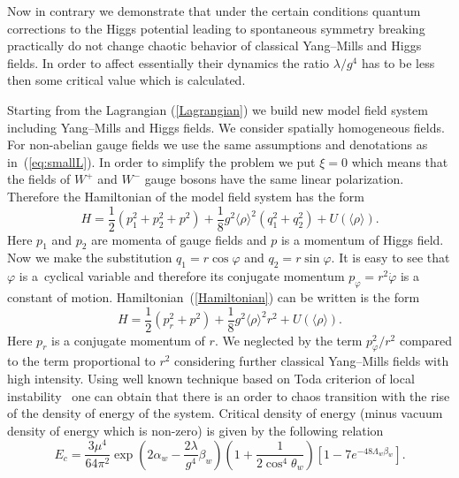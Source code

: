 \documentclass[a4paper,12pt]{article}
\begin{document}
Now in contrary we demonstrate that under the certain conditions quantum corrections
to the Higgs potential leading to spontaneous symmetry breaking practically do not
change chaotic behavior of classical Yang--Mills and Higgs fields. In order to affect
essentially their dynamics the ratio $\lambda / g^{4}$ has to be less then some
critical value which is calculated.

Starting from the Lagrangian (\ref{Lagrangian}) we build new model field system
including Yang--Mills and Higgs fields. We consider spatially homogeneous fields. For
non-abelian gauge fields we use the same assumptions and denotations as
 in~(\ref{eq:smallL}). In order to simplify the problem we put $\xi =0$ which means that
the fields of $W^+$ and $W^-$ gauge bosons have the same linear polarization.
Therefore the Hamiltonian of the model field system has the form
\begin{equation}\label{Hamiltonian}
H = \frac{1}{2}\left(p_1^2 + p_2^2 + p^2\right) + \frac{1}{8} g^{2} \langle
\rho\rangle^{2} \left(q_1^2 + q_2^2\right) + U(\langle \rho\rangle).
\end{equation}
Here $p_1$ and $p_2$ are momenta of gauge fields and $p$ is a momentum of Higgs field.
Now we make the substitution $q_1 = r \cos{\varphi}$ and $q_2 = r \sin{\varphi}$. It
is easy to see that $\varphi$ is a~cyclical variable and therefore its conjugate
momentum $p_\varphi = r^2 \dot{\varphi}$ is a constant of motion.
Hamiltonian~(\ref{Hamiltonian}) can be written is the form
\begin{equation}\label{H}
  H = \frac{1}{2} \left(p_r^2 + p^2\right) + \frac{1}{8} g^{2} \langle \rho\rangle^2 r^2 +
U(\langle\rho\rangle).
\end{equation}
Here $p_r$ is a conjugate momentum of $r$. We neglected by the term $p_\varphi^2 /
r^2$ compared to the term proportional to $r^2$ considering further classical
Yang--Mills fields with high intensity. Using well known technique based on Toda
criterion of local instability~\cite{Salasnich, PLA} one can obtain that there is an
order to chaos transition with the rise of the density of energy of the system.
Critical density of energy (minus vacuum density of energy which is non-zero) is given
by the following relation
\begin{equation}\label{NewE}
 E_c = \frac{3 \mu^4}{64 \pi^2} \exp{\left( 2 \alpha_w - \frac{2\lambda}{g^4}
  \beta_w \right)}\left(1 + \frac{1}{2 \cos^4{\theta_w}}\right) \left[ 1 - 7 e^{-48 \Lambda_w \beta_w}  \right].
\end{equation}
\end{document}
